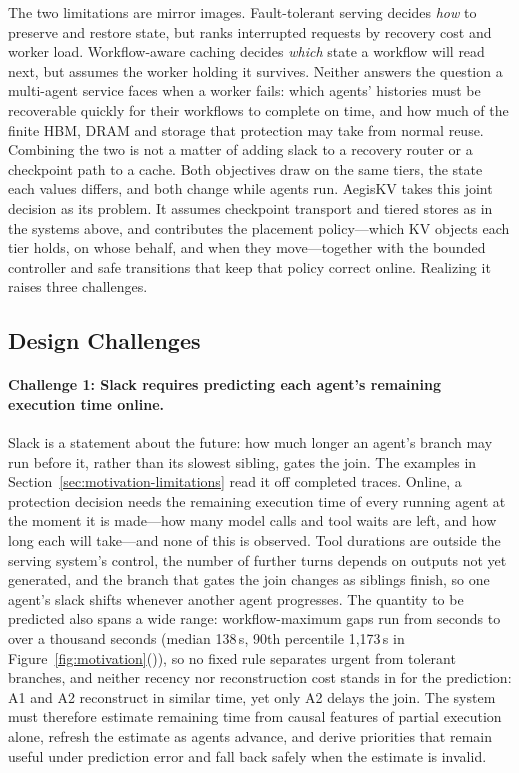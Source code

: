 \label{sec:motivation-long-context}
The two limitations are mirror images. Fault-tolerant serving decides
\emph{how} to preserve and restore state, but ranks interrupted requests
by recovery cost and worker load. Workflow-aware caching decides
\emph{which} state a workflow will read next, but assumes the worker
holding it survives. Neither answers the question a multi-agent service
faces when a worker fails: which agents' histories must be recoverable
quickly for their workflows to complete on time, and how much of the
finite HBM, DRAM and storage that protection may take from normal reuse.
Combining the two is not a matter of adding slack to a recovery router
or a checkpoint path to a cache. Both objectives draw on the same tiers,
the state each values differs, and both change while agents run.
AegisKV takes this joint decision as its problem. It assumes checkpoint
transport and tiered stores as in the systems above, and contributes the
placement policy---which KV objects each tier holds, on whose behalf,
and when they move---together with the bounded controller and safe
transitions that keep that policy correct online. Realizing it raises
three challenges.

\subsection{Design Challenges}
\label{sec:motivation-challenges}

\paragraph{Challenge 1: Slack requires predicting each agent's remaining execution time online.}
Slack is a statement about the future: how much longer an agent's
branch may run before it, rather than its slowest sibling, gates the
join. The examples in Section~\ref{sec:motivation-limitations} read it
off completed traces. Online, a protection decision needs the remaining
execution time of every running agent at the moment it is made---how
many model calls and tool waits are left, and how long each will
take---and none of this is observed. Tool durations are outside the
serving system's control, the number of further turns depends on outputs
not yet generated, and the branch that gates the join changes as
siblings finish, so one agent's slack shifts whenever another agent
progresses. The quantity to be predicted also spans a wide range:
workflow-maximum gaps run from seconds to over a thousand seconds
(median 138\,s, 90th percentile 1,173\,s in
Figure~\ref{fig:motivation}()), so no
fixed rule separates urgent from tolerant branches, and neither recency
nor reconstruction cost stands in for the prediction: A1 and A2
reconstruct in similar time, yet only A2 delays the join. The system
must therefore estimate remaining time from causal features of partial
execution alone, refresh the estimate as agents advance, and derive
priorities that remain useful under prediction error and fall back
safely when the estimate is invalid.

